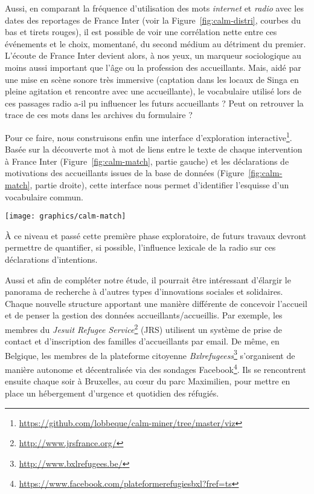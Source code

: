 \documentclass[symmetric,justified,marginals=raggedouter]{tufte-book}
\begin{document}
Aussi, en comparant la fréquence d'utilisation des mots \textit{internet} et \textit{radio} avec les dates des reportages de France Inter (voir la Figure~\ref{fig:calm-distri}, courbes du bas et tirets rouges), il est possible de voir une corrélation nette entre ces événements et le choix, momentané, du second médium au détriment du premier. L'écoute de France Inter devient alors, à nos yeux, un marqueur sociologique au moins aussi important que l'âge ou la profession des accueillants. Mais, aidé par une mise en scène sonore très immersive (captation dans les locaux de Singa en pleine agitation et rencontre avec une accueillante), le vocabulaire utilisé lors de ces passages radio a-il pu influencer les futurs accueillants ? Peut on retrouver la trace de ces mots dans les archives du formulaire ? 

Pour ce faire, nous construisons enfin une interface d'exploration interactive\footnote{\RaggedOuter \url{https://github.com/lobbeque/calm-miner/tree/master/viz}}. Basée sur la découverte mot à mot de liens entre le texte de chaque intervention à France Inter (Figure~\ref{fig:calm-match}, partie gauche) et les déclarations de motivations des accueillants issues de la base de données (Figure~\ref{fig:calm-match}, partie droite), cette interface nous permet d'identifier l'esquisse d'un vocabulaire commun.

\begin{figure*}
  \texttt{[image: graphics/calm-match]}
  \caption{Utilisation d'un même vocabulaire (bleu) entre les reportages de France Inter (gauche) et les déclarations de motivation des accueillants (droite)}
  \label{fig:calm-match}
\end{figure*}

\noindent À ce niveau et passé cette première phase exploratoire, de futurs travaux devront permettre de quantifier, si possible, l'influence lexicale de la radio sur ces déclarations d'intentions. 

Aussi et afin de compléter notre étude, il pourrait être intéressant d'élargir le panorama de recherche à d'autres types d'innovations sociales et solidaires. Chaque nouvelle structure apportant une manière différente de concevoir l'accueil et de penser la gestion des données accueillants/accueillis. Par exemple, les membres du \textit{Jesuit Refugee Service}\footnote{\RaggedOuter \url{http://www.jrsfrance.org/}} (JRS) utilisent un système de prise de contact et d'inscription des familles d'accueillants par email. De même, en Belgique, les membres de la plateforme citoyenne \textit{Bxlrefugeess}\footnote{\RaggedOuter \url{http://www.bxlrefugees.be/}} s'organisent de manière autonome et décentralisée via des sondages Facebook\footnote{\RaggedOuter \url{https://www.facebook.com/plateformerefugiesbxl?fref=ts}}. Ils se rencontrent ensuite chaque soir à Bruxelles, au cœur du parc Maximilien, pour mettre en place un hébergement d'urgence et quotidien des réfugiés.
\end{document}
